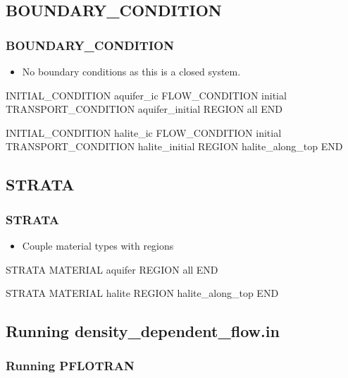 \documentclass{beamer}
\begin{document}
\subsection{BOUNDARY\_CONDITION}

\begin{frame}[fragile]\frametitle{BOUNDARY\_CONDITION}

\begin{itemize}
  \item No boundary conditions as this is a closed system.
\end{itemize}

\begin{semiverbatim}
INITIAL_CONDITION aquifer_ic
  FLOW_CONDITION initial
  TRANSPORT_CONDITION aquifer_initial
  REGION all
END

INITIAL_CONDITION halite_ic
  FLOW_CONDITION initial
  TRANSPORT_CONDITION halite_initial
  REGION halite_along_top
END
\end{semiverbatim}

\end{frame}

\subsection{STRATA}

\begin{frame}[fragile]\frametitle{STRATA}

\begin{itemize}
\item Couple material types with regions
\end{itemize}

\begin{semiverbatim}
STRATA
  MATERIAL aquifer
  REGION all
END

STRATA
  MATERIAL halite
  REGION halite_along_top
END
\end{semiverbatim}

\end{frame}



\subsection{Running density_dependent_flow.in}

\begin{frame}[fragile]\frametitle{Running PFLOTRAN}


\end{frame}
\end{document}
